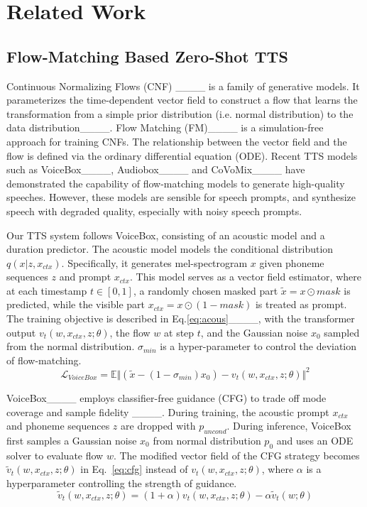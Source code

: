 \section{Related Work}
\subsection{Flow-Matching Based Zero-Shot TTS}
\label{sec:related_work}


Continuous Normalizing Flows (CNF) ____ is a family of generative models. It parameterizes the time-dependent vector field to construct a flow that learns the transformation from a simple prior distribution (i.e. normal distribution) to the data distribution____. 
Flow Matching (FM)____ is a simulation-free approach for training CNFs. The relationship between the vector field and the flow is defined via the ordinary differential
equation (ODE). Recent TTS models such as VoiceBox____, Audiobox____ and CoVoMix____  have demonstrated the capability of flow-matching models to generate high-quality speeches. However, these models are sensible for speech prompts, and synthesize speech with degraded quality, especially with noisy speech prompts. 

Our TTS system follows VoiceBox, consisting of an acoustic model and a duration predictor. The acoustic model models the conditional distribution $q(x | z, x_{ctx})$. Specifically, it generates mel-spectrogram $x$ given phoneme sequences $z$ and prompt $x_{ctx}$.  This model serves as a vector field estimator, where at each timestamp $t \in [0,1]$, a randomly chosen masked part $\tilde{x} = x\odot mask$ is predicted, while the visible part $x_{ctx} = x \odot (1-mask)$ is treated as prompt. 
The training objective is described in Eq.\ref{eq:acous}____,  with the transformer output $v_t(w, x_{ctx}, z; \theta)$, the flow $w$ at step $t$, and the Gaussian noise $x_0$ sampled from the normal distribution. $\sigma_{min}$ is a hyper-parameter to control the deviation of flow-matching.  
\begin{equation}
    \mathcal{L}_{VoiceBox} = \mathbb{E} \Vert (\tilde{x} - (1 - \sigma_{min})x_0) - v_t(w, x_{ctx}, z ; \theta) \Vert^2
    \label{eq:acous}
\end{equation}

VoiceBox____ employs classifier-free guidance (CFG) to trade off mode coverage and sample fidelity ____. 
During training, the acoustic prompt $x_{ctx}$ and phoneme sequences $z$ are dropped with $p_{uncond}$. During inference, VoiceBox first samples a Gaussian noise $x_0$ from normal distribution $p_0$ and uses an ODE solver to evaluate flow $w$. The modified vector field of the CFG strategy becomes $\tilde{v}_t(w, x_{ctx}, z; \theta)$ in Eq.~\ref{eq:cfg} instead of $v_t(w, x_{ctx}, z; \theta)$, where $\alpha$ is a hyperparameter controlling the strength of guidance. 
\begin{equation}
    \tilde{v}_t(w, x_{ctx}, z ; \theta) = (1 + \alpha) v_t(w, x_{ctx}, z ; \theta) - \alpha \tilde{v}_t(w; \theta)
    \label{eq:cfg}
\end{equation}

